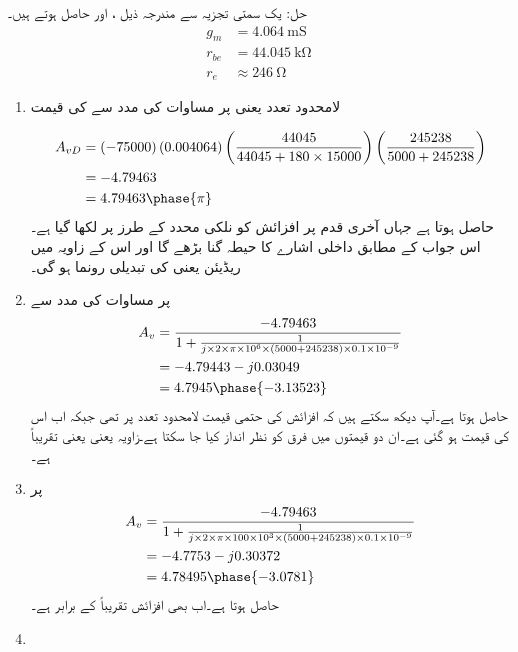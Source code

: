حل: یک سمتی  تجزیہ سے مندرجہ ذیل ،  اور  حاصل ہوتے ہیں۔
\begin{align*}
g_m&=\SI{4.064}{\milli \siemens}\\
r_{be}&=\SI{44.045}{\kilo \ohm}\\
r_e& \approx \SI{246}{\ohm}
\end{align*}
%
\begin{enumerate}
\item
لامحدود تعدد یعنی   پر مساوات   کی مدد سے  کی قیمت

\begin{align*}
A_{vD}&=\left ( -75000 \right ) \left( 0.004064 \right) \left (\frac{44045}{44045+180 \times 15000} \right ) \left (\frac{245238}{5000+245238} \right ) \\ 
&=-4.79463\\
&=4.79463 \phase {\pi}
\end{align*}
حاصل ہوتا ہے جہاں آخری قدم پر افزائش کو نلکی محدد  کے طرز پر لکھا گیا ہے۔اس جواب کے مطابق داخلی اشارے کا حیطہ  گنا بڑھے گا اور اس کے زاویہ میں   ریڈیئن یعنی  کی تبدیلی رونما ہو گی۔
\item
{} پر مساوات   کی مدد سے
\begin{align*}
A_v &=\frac{-4.79463}{1 + \frac{1}{j \times 2 \times \pi \times 10^{6} \times  (5000+245238) \times 0.1 \times 10^{-9}}} \\
&=-4.79443-j 0.03049\\
&=4.7945 \phase {-3.13523}
\end{align*}
حاصل ہوتا ہے۔آپ دیکھ سکتے ہیں کہ افزائش کی حتمی قیمت لامحدود تعدد پر تھی جبکہ اب اس کی قیمت  ہو گئی ہے۔ان دو قیمتوں میں فرق کو نظر انداز کیا جا سکتا ہے۔زاویہ  یعنی یعنی تقریباً  ہے۔
\item
{}	پر
\begin{align*}
A_v &=\frac{-4.79463}{1 + \frac{1}{j \times 2 \times \pi \times 100 \times 10^{3} \times  (5000+245238) \times 0.1 \times 10^{-9}}} \\
&=-4.7753-j 0.30372\\
&=4.78495 \phase {-3.0781}
\end{align*}
حاصل ہوتا ہے۔اب بھی افزائش تقریباً  کے برابر ہے۔
\item

\end{enumerate}
